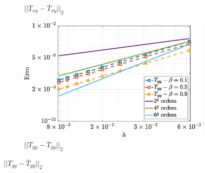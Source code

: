 \begin{figure}[H]
\begin{subfigure}[b]{.47\textwidth}
        \caption{$||T_{xy} - \overline{T}_{xy}||_{2}$}
        \label{error_txy_2nd_Case1_giesekus_alphaG_0.1}
    \end{subfigure}
    \qquad
    \begin{subfigure}[b]{.47\textwidth}
        \includegraphics[width=\textwidth]{figures/Case12/Giesekus/Errors/NormErr_2nd_Re_100_Wi_1_epsilon_0_xi_0_alphaG_0.1_Dt_1e-06_at_0.05_tipsim_1_MMS_12_Tyy.eps}
        \caption{$||T_{yy} - \overline{T}_{yy}||_{2}$}
        \label{error_tyy_2nd_Case1_giesekus_alphaG_0.1}
    \end{subfigure}
    \fautor
\end{figure}

